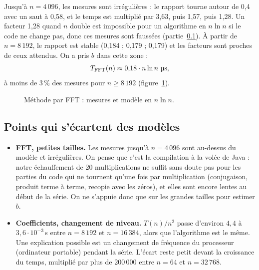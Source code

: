 \documentclass[11pt,a4paper]{article}
\newcommand{\us}{\,\textmu s\xspace}
\begin{document}
Jusqu'à $n = 4\,096$, les mesures sont irrégulières : le rapport tourne autour de 0,4
avec un saut à 0,58, et le temps est multiplié par 3,63, puis 1,57, puis 1,28. Un
facteur 1,28 quand $n$ double est impossible pour un algorithme en $n \ln n$ si le code
ne change pas, donc ces mesures sont faussées (partie~\ref{sec:ecarts}). À partir de
$n = 8\,192$, le rapport est stable (0,184 ; 0,179 ; 0,179) et les facteurs sont
proches de ceux attendus. On a pris $b$ dans cette zone :
\[
  T_{\text{FFT}}(n) \approx 0{,}18 \cdot n \ln n \ \text{\textmu s},
\]
à moins de 3\,\% des mesures pour $n \geq 8\,192$ (figure~\ref{fig:fft}).

\begin{figure}[H]
\centering
{}
\caption{Méthode par FFT : mesures et modèle en $n \ln n$.}
\label{fig:fft}
\end{figure}

\subsection{Points qui s'écartent des modèles}
\label{sec:ecarts}

\begin{itemize}
  \item \textbf{FFT, petites tailles.} Les mesures jusqu'à $n = 4\,096$ sont au-dessus
        du modèle et irrégulières. On pense que c'est la compilation à la volée de
        Java : notre échauffement de 20 multiplications ne suffit sans doute pas pour
        les parties du code qui ne tournent qu'une fois par multiplication
        (conjugaison, produit terme à terme, recopie avec les zéros), et elles sont
        encore lentes au début de la série. On ne s'appuie donc que sur les grandes
        tailles pour estimer $b$.
  \item \textbf{Coefficients, changement de niveau.} $T(n)/n^2$ passe d'environ
        $4{,}4$ à $3{,}6 \cdot 10^{-3}$\us entre $n = 8\,192$ et $n = 16\,384$, alors
        que l'algorithme est le même. Une explication possible
        est un changement de fréquence du processeur (ordinateur portable) pendant la
        série. L'écart reste petit devant la croissance du temps, multiplié par plus de
        200\,000 entre $n = 64$ et $n = 32\,768$.
\end{itemize}
\end{document}
